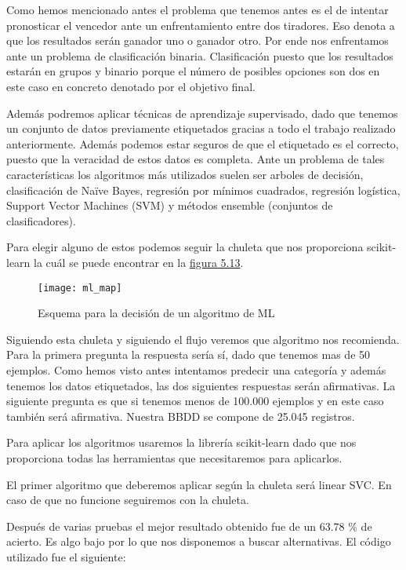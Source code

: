 Como hemos mencionado antes el problema que tenemos antes es el de intentar pronosticar
el vencedor ante un enfrentamiento entre dos tiradores. Eso denota a que los resultados
serán ganador uno o ganador otro. Por ende nos enfrentamos ante un problema de clasificación
binaria. Clasificación puesto que los resultados estarán en grupos y binario porque el número
de posibles opciones son dos en este caso en concreto denotado por el objetivo final.

Además podremos aplicar técnicas de aprendizaje supervisado, dado que tenemos un conjunto de datos
previamente etiquetados gracias a todo el trabajo realizado anteriormente. Además podemos
estar seguros de que el etiquetado es el correcto, puesto que la veracidad de estos datos
es completa. Ante un problema de tales características los algoritmos más utilizados suelen ser
arboles de decisión, clasificación de Naïve Bayes, regresión por mínimos cuadrados, regresión
logística, Support Vector Machines (SVM) y métodos ensemble (conjuntos de clasificadores).

Para elegir alguno de estos podemos seguir la chuleta\cite{scikitCheatSheet} que nos proporciona scikit-learn la cuál se
puede encontrar en la \hyperref[fig:Chuleta decisión algoritmo ML]{figura 5.13}.

\begin{figure}[htb]
  \centering
    \texttt{[image: ml\_map]}
  \caption[Esquema para la decisión de un algoritmo de ML]{Esquema para la decisión de un algoritmo de ML}
  \label{fig:Chuleta decisión algoritmo ML}
\end{figure}

Siguiendo esta chuleta y siguiendo el flujo veremos que algoritmo nos recomienda.
Para la primera pregunta la respuesta sería sí, dado que tenemos mas de 50 ejemplos.
Como hemos visto antes intentamos predecir una categoría y además tenemos los datos
etiquetados, las dos siguientes respuestas serán afirmativas. La siguiente pregunta
es que si tenemos menos de 100.000 ejemplos y en este caso también será afirmativa.
Nuestra \acs{BBDD} se compone de 25.045 registros.

Para aplicar los algoritmos usaremos la librería scikit-learn dado que nos proporciona
todas las herramientas que necesitaremos para aplicarlos.

El primer algoritmo que deberemos aplicar según la chuleta será linear SVC. En caso
de que no funcione seguiremos con la chuleta.

Después de varias pruebas el mejor resultado obtenido fue de un 63.78 \% de acierto. Es
algo bajo por lo que nos disponemos a buscar alternativas. El código utilizado fue el siguiente:

